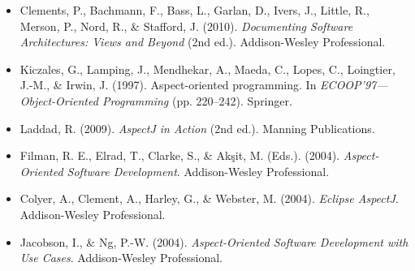 \documentclass[11pt]{article}
\begin{document}
\begin{itemize}
  \item Clements, P., Bachmann, F., Bass, L., Garlan, D., Ivers, J., Little, R., Merson, P., Nord, R., \& Stafford, J. (2010). \textit{Documenting Software Architectures: Views and Beyond} (2nd ed.). Addison-Wesley Professional.
  \item Kiczales, G., Lamping, J., Mendhekar, A., Maeda, C., Lopes, C., Loingtier, J.-M., \& Irwin, J. (1997). Aspect-oriented programming. In \textit{ECOOP'97---Object-Oriented Programming} (pp. 220--242). Springer.
  \item Laddad, R. (2009). \textit{AspectJ in Action} (2nd ed.). Manning Publications.
  \item Filman, R. E., Elrad, T., Clarke, S., \& Ak\c{s}it, M. (Eds.). (2004). \textit{Aspect-Oriented Software Development}. Addison-Wesley Professional.
  \item Colyer, A., Clement, A., Harley, G., \& Webster, M. (2004). \textit{Eclipse AspectJ}. Addison-Wesley Professional.
  \item Jacobson, I., \& Ng, P.-W. (2004). \textit{Aspect-Oriented Software Development with Use Cases}. Addison-Wesley Professional.
\end{itemize}

\listoffigures
\end{document}
